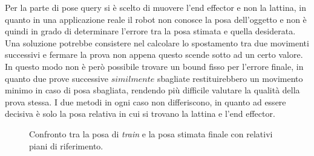 \documentclass[english]{article}
\begin{document}
Per la parte di pose query si è scelto di muovere l'end effector e non la lattina, in quanto in una applicazione reale il robot non conosce la posa dell'oggetto e non è quindi in grado di determinare l'errore tra la posa stimata e quella desiderata. Una soluzione potrebbe consistere nel calcolare lo spostamento tra due movimenti successivi e fermare la prova non appena questo scende sotto ad un certo valore. In questo modo non è però possibile trovare un bound fisso per l'errore finale, in quanto due prove successive $similmente$ sbagliate restituirebbero un movimento minimo in caso di posa sbagliata, rendendo più difficile valutare la qualità della prova stessa. I due metodi in ogni caso non differiscono, in quanto ad essere decisiva è solo la posa relativa in cui si trovano la lattina e l'end effector.

\begin{figure}[!ht]
\centering
{}
\caption{Confronto tra la posa di \textit{train} e la posa stimata finale con relativi piani di riferimento.}
\label{fig:extr_poses}
\end{figure}
\end{document}
